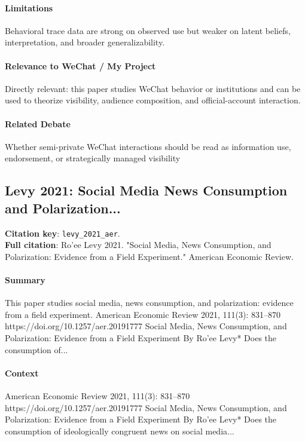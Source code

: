 \documentclass[12pt]{article}
\begin{document}
\paragraph{Limitations} Behavioral trace data are strong on observed use but weaker on latent beliefs, interpretation, and broader generalizability.

\paragraph{Relevance to WeChat / My Project} Directly relevant: this paper studies WeChat behavior or institutions and can be used to theorize visibility, audience composition, and official-account interaction.

\paragraph{Related Debate} Whether semi-private WeChat interactions should be read as information use, endorsement, or strategically managed visibility


\subsection{Levy 2021: Social Media News Consumption and Polarization...}
\textbf{Citation key}: \texttt{levy\_2021\_aer}.\\
\textbf{Full citation}: Ro'ee Levy 2021. "Social Media, News Consumption, and Polarization: Evidence from a Field Experiment." American Economic Review.

\paragraph{Summary} This paper studies social media, news consumption, and polarization: evidence from a field experiment. American Economic Review 2021, 111(3): 831--870 https://doi.org/10.1257/aer.20191777 Social Media, News Consumption, and Polarization: Evidence from a Field Experiment By Ro'ee Levy* Does the consumption of...

\paragraph{Context} American Economic Review 2021, 111(3): 831--870 https://doi.org/10.1257/aer.20191777 Social Media, News Consumption, and Polarization: Evidence from a Field Experiment By Ro'ee Levy* Does the consumption of ideologically congruent news on social media...
\end{document}
